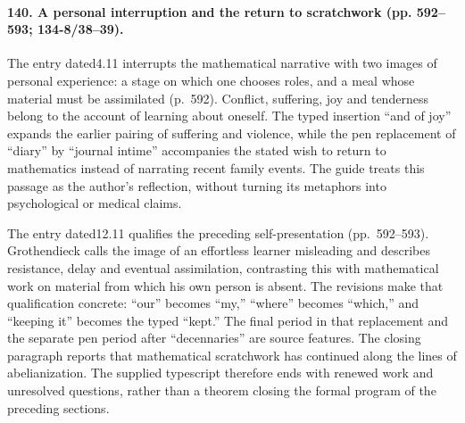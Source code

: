 \paragraph{140. A personal interruption and the return to scratchwork (pp. 592--593; 134-8/38--39).}
The entry dated4.11 interrupts the mathematical narrative with two images of personal experience: a stage on which one chooses roles, and a meal whose material must be assimilated (p.~592). Conflict, suffering, joy and tenderness belong to the account of learning about oneself. The typed insertion ``and of joy'' expands the earlier pairing of suffering and violence, while the pen replacement of ``diary'' by ``journal intime'' accompanies the stated wish to return to mathematics instead of narrating recent family events. The guide treats this passage as the author's reflection, without turning its metaphors into psychological or medical claims.

The entry dated12.11 qualifies the preceding self-presentation (pp.~592--593). Grothendieck calls the image of an effortless learner misleading and describes resistance, delay and eventual assimilation, contrasting this with mathematical work on material from which his own person is absent. The revisions make that qualification concrete: ``our'' becomes ``my,'' ``where'' becomes ``which,'' and ``keeping it'' becomes the typed ``kept.'' The final period in that replacement and the separate pen period after ``decennaries'' are source features. The closing paragraph reports that mathematical scratchwork has continued along the lines of abelianization. The supplied typescript therefore ends with renewed work and unresolved questions, rather than a theorem closing the formal program of the preceding sections.

